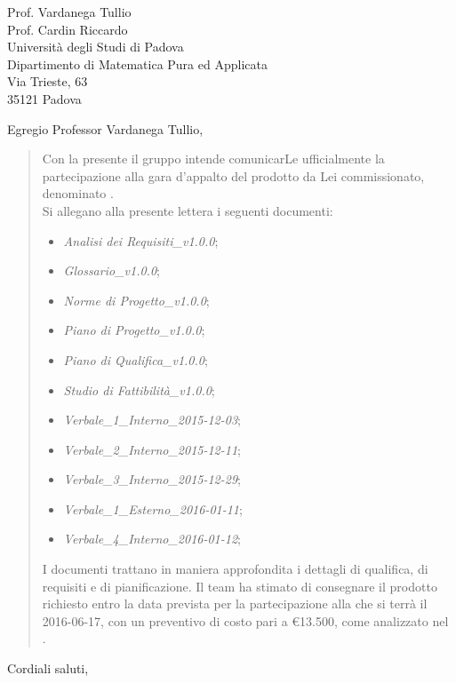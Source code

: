 \documentclass{letter}
\begin{document}

\begin{letter}{\hfill Prof. Vardanega Tullio \\
	\hfill Prof. Cardin Riccardo \\
	\hfill Università degli Studi di Padova \\
	\hfill Dipartimento di Matematica Pura ed Applicata \\
	\hfill Via Trieste, 63 \\
	\hfill 35121 Padova}

\date{}
\opening{Egregio Professor Vardanega Tullio,}
 
	\begin{quotation}			
		Con la presente il gruppo \textit{\gruppo} intende comunicarLe ufficialmente la partecipazione alla gara d'appalto del prodotto da Lei commissionato, denominato \textbf{\progetto}.
		\\
		Si allegano alla presente lettera i seguenti documenti:
		\begin{itemize}
			\item \textit{Analisi dei Requisiti\_v1.0.0};
			\item \textit{Glossario\_v1.0.0};
			\item \textit{Norme di Progetto\_v1.0.0};
			\item \textit{Piano di Progetto\_v1.0.0};
			\item \textit{Piano di Qualifica\_v1.0.0};
			\item \textit{Studio di Fattibilità\_v1.0.0};
			\item \textit{Verbale\_1\_Interno\_2015-12-03};
			\item \textit{Verbale\_2\_Interno\_2015-12-11};
			\item \textit{Verbale\_3\_Interno\_2015-12-29};
			\item \textit{Verbale\_1\_Esterno\_2016-01-11};
			\item \textit{Verbale\_4\_Interno\_2016-01-12};
		\end{itemize}
		I documenti trattano in maniera approfondita i dettagli di qualifica, di requisiti e di pianificazione.	
		Il team ha stimato di consegnare il prodotto richiesto entro la data prevista per la partecipazione alla \textit{\RA} che si terrà il 2016-06-17, con un preventivo di costo pari a \euro13.500, come analizzato nel \textit{\PdP}.	
	\end{quotation}
	\closing{Cordiali saluti,}


\end{letter}
 
\end{document}
